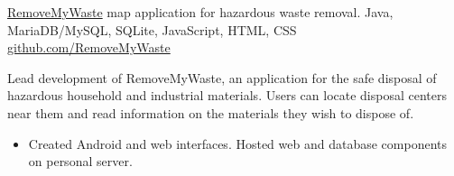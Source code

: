 \showoff
{\textcolor{my-blue}{\href{https://removemywaste.liambeckman.com/}{RemoveMyWaste}}}
{map application for hazardous waste removal.}
{Java, MariaDB/MySQL, SQLite, JavaScript, HTML, CSS}
{\textcolor{my-blue}{\href{https://github.com/RemoveMyWaste/RemoveMyWaste}{github.com/RemoveMyWaste}}}

Lead development of RemoveMyWaste, an application for the safe disposal of hazardous household and industrial materials. Users can locate disposal centers near them and read information on the materials they wish to dispose of.

\begin{itemize}[label=$\triangleright$, itemsep=0, topsep=5px]
\item Created Android and web interfaces. Hosted web and database components on personal server.
\end{itemize}


\myBreak
